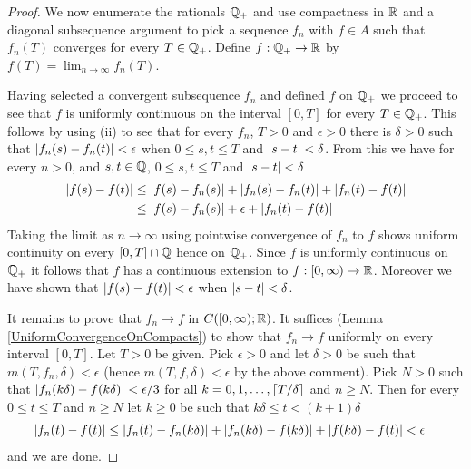 \begin{proof}
We now enumerate the rationals $\mathbb{Q}_+$ and use
compactness in $\mathbb{R}$ and a diagonal
subsequence argument to pick a sequence $f_n$ with $f \in A$ such that
$f_n(T)$ converges for every $T \in \mathbb{Q}_+$.  Define $f :
\mathbb{Q}_+ \to \mathbb{R}$ by $f(T) = \lim_{n \to \infty} f_n(T)$.

Having selected a convergent subsequence $f_n$ and defined $f$ on
$\mathbb{Q}_+$ we proceed to see that $f$ is uniformly continuous on
the
interval $[0,T]$ for every $T \in \mathbb{Q}_+$.
This follows by using (ii) to see that for every $f_n$, $T > 0$ and 
$\epsilon > 0$ there is $\delta > 0$ such that $\left \vert f_n(s) - f_n(t) \right \vert <
\epsilon$ when $0 \leq s,t \leq T$ and $\left \vert s - t \right \vert <\delta$.  From
this we have for every $n>0$, and $s,t \in \mathbb{Q}$, $0 \leq s,t
\leq T$ and $\left \vert s-t \right \vert < \delta$
\begin{align*}
\left \vert f(s) -f(t) \right \vert &\leq \left \vert f(s) -f_n(s) \right \vert + \left \vert f_n(s) -f_n(t) \right \vert +
\left \vert f_n(t) - f(t) \right \vert \\
&\leq \left \vert f(s) -f_n(s) \right \vert + \epsilon +
\left \vert f_n(t) - f(t) \right \vert
\end{align*}
Taking the limit as $n \to \infty$ using pointwise convergence of
$f_n$ to $f$ shows uniform continuity on every
$[0,T] \cap \mathbb{Q}$ hence on $\mathbb{Q}_+$.  Since $f$ is uniformly continuous on
$\mathbb{Q}_+$ it follows that $f$ has a continuous extension to $f :
[0,\infty) \to \mathbb{R}$.  Moreover we have shown that $\left \vert f(s) -f(t) \right \vert
< \epsilon$ when $\left \vert s -t \right \vert < \delta$.

It remains to prove that $f_n \to f$ in $C([0,\infty); \mathbb{R})$.  It
suffices (Lemma \ref{UniformConvergenceOnCompacts}) to show that $f_n
\to f$ uniformly on every interval $[0,T]$.  Let $T > 0$ be given.
Pick $\epsilon > 0$ and let
$\delta > 0$ be such that $m(T,f_n,\delta) < \epsilon$ (hence $m(T,f,\delta)
< \epsilon$ by the above comment).   Pick $N > 0$ such that
$\left \vert f_n(k\delta) - f(k\delta) \right \vert < \epsilon/3$ for all $k=0,1, \dotsc,
\lceil T/\delta \rceil$ and $n \geq N$.  Then for every $0 \leq t \leq T$ and
$n \geq N$ let $k\geq 0$ be such that $k\delta \leq t < (k+1)\delta$
\begin{align*}
\left \vert f_n(t) - f(t) \right \vert &\leq \left \vert f_n(t) - f_n(k\delta) \right \vert
+\left \vert f_n(k\delta) - f(k\delta) \right \vert +\left \vert f(k\delta) - f(t) \right \vert < \epsilon
\end{align*}
and we are done.
\end{proof}

